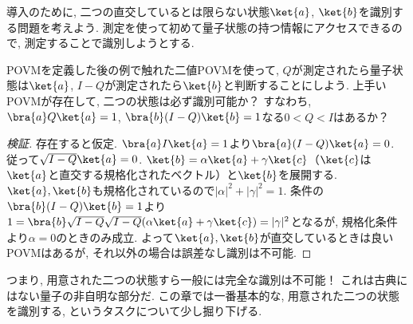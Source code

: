 導入のために, 二つの直交しているとは限らない状態$\ket{a}$, $\ket{b}$を識別する問題を考えよう. 
測定を使って初めて量子状態の持つ情報にアクセスできるので, 測定することで識別しようとする. 

\begin{tcolorbox}[colback=black!5!white,colframe=black!75!white]
    POVMを定義した後の例で触れた二値POVMを使って, $Q$が測定されたら量子状態は$\ket{a}$, $I-Q$が測定されたら$\ket{b}$と判断することにしよう.
    上手いPOVMが存在して, 二つの状態は必ず識別可能か？
    すなわち, $\bra{a}Q\ket{a}=1$, $\bra{b}(I-Q)\ket{b}=1$なる$0< Q < I$はあるか？
\end{tcolorbox}

\begin{proof}[検証]   
    存在すると仮定. 
    $\bra{a}I\ket{a}=1$より$\bra{a}(I-Q)\ket{a}=0$. 
    従って$\sqrt{I-Q}\ket{a}=0$. 
    $\ket{b}=\alpha\ket{a}+\gamma\ket{c}$（$\ket{c}$は$\ket{a}$と直交する規格化されたベクトル）と$\ket{b}$を展開する. 
    $\ket{a}, \ket{b}$も規格化されているので$|\alpha|^2+|\gamma|^2=1$. 
    条件の$\bra{b}(I-Q)\ket{b}=1$より$1=\bra{b}\sqrt{I-Q}\sqrt{I-Q}(\alpha\ket{a}+\gamma\ket{c})=|\gamma|^2$となるが, 規格化条件より$\alpha=0$のときのみ成立. 
    よって$\ket{a}, \ket{b}$が直交しているときは良いPOVMはあるが, それ以外の場合は誤差なし識別は不可能. 
\end{proof}

つまり, 用意された二つの状態すら一般には完全な識別は不可能！
これは古典にはない量子の非自明な部分だ. 
この章では一番基本的な, 用意された二つの状態を識別する, というタスクについて少し掘り下げる. 